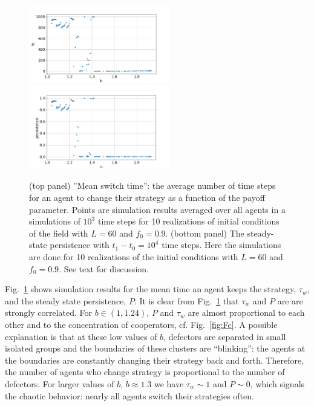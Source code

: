 \documentclass[a4paper]{jpconf}
\begin{document}
\begin{figure}[H]
\begin{center}
	\includegraphics[width=0.55\textwidth, keepaspectratio=True]{Change_time.png} \\
%
	\includegraphics[width=0.55\textwidth, keepaspectratio=True]{Persistence.png}
	\caption{(top panel) ''Mean switch time'': the average number of time steps for an agent to change their strategy as a function of the payoff parameter.  
	Points are simulation results averaged over all agents in a simulations of $10^{3}$ time steps for 10 realizations of initial conditions of the field with $L=60$ and $f_0 = 0.9$.
	(bottom panel) The steady-state persistence with $t_1 - t_0 = 10^4$ time steps. Here the simulations are done for 10 realizations of the initial conditions with $L=60$ and $f_0 = 0.9$. See text for discussion.
	}
	\label{fig:persistence}
\end{center}
\end{figure}


Fig.\ \ref{fig:persistence} shows simulation results for the mean time an agent keeps the strategy, $\tau_w$, and the steady state persistence, $P$. It is clear from Fig.\ \ref{fig:persistence} that $\tau_w$ and $P$ are
are strongly correlated. For $b\in(1, 1.24)$,  $P$ and $\tau_w$ are almost proportional to each other and to the concentration of cooperators, cf. Fig.\ \ref{fig:Fc}. 
A possible explanation is that at these low values of $b$, defectors are separated in small isolated groups
and the boundaries of these clusters are ``blinking'': the agents at the boundaries are constantly changing their strategy back and forth. Therefore, the number of agents who change strategy is proportional to the number of defectors.  
For larger values of $b$, $b \approx 1.3$ we have $\tau_w \sim 1$ and $P\sim 0$, which signals the chaotic behavior: nearly all agents switch their strategies often. 
\end{document}
